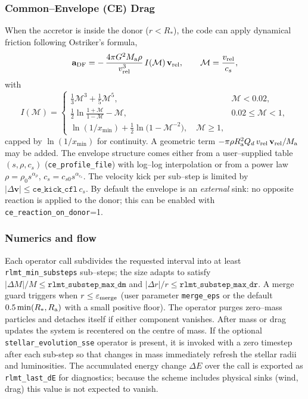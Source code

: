 \documentclass[11pt]{article}
\begin{document}
\subsubsection{Common–Envelope (CE) Drag}
When the accretor is inside the donor ($r<R_\ast$), the code can apply
dynamical friction following Ostriker’s formula,
\[
\mathbf a_{\rm DF} = -\,\frac{4\pi G^2 M_{\rm a}\rho}{v_{\rm rel}^3}\,
I(\mathcal M)\,\mathbf v_{\rm rel},\qquad\mathcal M=\frac{v_{\rm rel}}{c_s},
\]
with
\[
I(\mathcal M)=
\begin{cases}
\frac{1}{3}\mathcal M^3+\frac{1}{5}\mathcal M^5, & \mathcal M<0.02,\\[0.4em]
\frac{1}{2}\ln\!\frac{1+\mathcal M}{1-\mathcal M}-\mathcal M, & 0.02\le\mathcal M<1,\\[0.4em]
\ln(1/x_{\min})+\tfrac12\ln\!\bigl(1-\mathcal M^{-2}\bigr), \quad \mathcal M\ge1,
\end{cases}
\]
capped by $\ln(1/x_{\min})$ for continuity. A geometric term
$-\pi\rho R_{\rm a}^2 Q_d\,v_{\rm rel}\,\mathbf v_{\rm rel}/M_{\rm a}$ may be
added. The envelope structure comes either from a user–supplied table
$(s,\rho,c_s)$ (\texttt{ce\_profile\_file}) with log–log interpolation or from
a power law $\rho=\rho_0 s^{\alpha_\rho}$, $c_s=c_{s0}s^{\alpha_{c_s}}$.
The velocity kick per sub–step is limited by
$|\Delta\mathbf v|\le\texttt{ce\_kick\_cfl}\,c_s$.
By default the envelope is an \emph{external} sink: no opposite reaction is
applied to the donor; this can be enabled with \texttt{ce\_reaction\_on\_donor}=1.

\subsubsection{Numerics and flow}
Each operator call subdivides the requested interval into at least
\texttt{rlmt\_min\_substeps} sub–steps; the size adapts to satisfy
$|\Delta M|/M\le\texttt{rlmt\_substep\_max\_dm}$ and
$|\Delta r|/r\le\texttt{rlmt\_substep\_max\_dr}$. A merge guard triggers when
$r\le\varepsilon_{\rm merge}$ (user parameter \texttt{merge\_eps} or the
default $0.5\min(R_\ast,R_{\rm a})$ with a small positive floor). The operator
purges zero–mass particles and detaches itself if either component vanishes.
After mass or drag updates the system is recentered on the centre of mass.
If the optional \texttt{stellar\_evolution\_sse} operator is present, it is
invoked with a zero timestep after each sub-step so that changes in mass
immediately refresh the stellar radii and luminosities.
The accumulated energy change $\Delta E$ over the call is exported as
\texttt{rlmt\_last\_dE} for diagnostics; because the scheme includes physical
sinks (wind, drag) this value is not expected to vanish.
\end{document}
